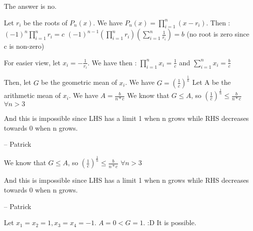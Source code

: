 \begin{solution}
	The answer is no.

Let $r_{i}$ be the roots of $P_{n}(x)$. We have $P_{n}(x)=\prod_{i=1}^{n}(x-r_{i})$. Then :
$(-1)^{n}\prod_{i=1}^{n}r_{i}=c$
$(-1)^{n-1}(\prod_{i=1}^{n}r_{i})(\sum_{i=1}^{n}\frac{1}{r_{i}})=b$  (no root is zero since c is non-zero)

For easier view, let $x_{i}=-\frac{1}{r_{i}}$. We have then : $\prod_{i=1}^{n}x_{i}=\frac{1}{c}$ and  $\sum_{i=1}^{n}x_{i}=\frac{b}{c}$  

Then, let $G$ be the geometric mean of $x_{i}$. We have $G=(\frac{1}{c})^{\frac{1}{n}}$
Let A be the arithmetic mean of $x_{i}$. We have $A=\frac{b}{n*c^{}}$
We know that $G\leq A$, so $(\frac{1}{c})^{\frac{1}{n}}\leq \frac{b}{n*c^{}}$ $\forall n>3$

And this is impossible since LHS has a limit 1 when n grows while RHS decreases towards 0 when n grows.

-- 
Patrick
\end{solution}



\begin{solution}
	\begin{tcolorbox}We know that $G\leq A$, so $(\frac{1}{c})^{\frac{1}{n}}\leq \frac{b}{n*c^{}}$ $\forall n>3$

And this is impossible since LHS has a limit 1 when n grows while RHS decreases towards 0 when n grows.

-- 
Patrick\end{tcolorbox}
Let $x_{1}=x_{2}=1,x_{3}=x_{4}=-1$. $A=0<G=1$. :D 
It is possible.
\end{solution}



